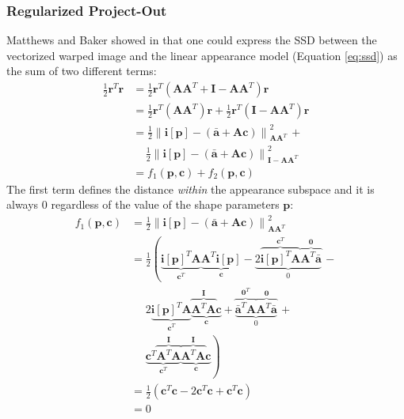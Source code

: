 \subsubsection{Regularized Project-Out}
\label{sec:rpo}

Matthews and Baker showed in \cite{Matthews2004} that one could express the SSD between the vectorized warped image and the linear appearance model (Equation \ref{eq:ssd}) as the sum of two different terms:
\begin{equation}
    \begin{aligned}
        \frac{1}{2}\mathbf{r}^T \mathbf{r} & = \frac{1}{2}\mathbf{r}^T (\mathbf{A}\mathbf{A}^T + \mathbf{I} - \mathbf{A}\mathbf{A}^T) \mathbf{r}
        \\
        & = \frac{1}{2}\mathbf{r}^T (\mathbf{A}\mathbf{A}^T) \mathbf{r} + \frac{1}{2}\mathbf{r}^T (\mathbf{I} - \mathbf{A}\mathbf{A}^T) \mathbf{r}
        \\
        & = \frac{1}{2}\left\| \mathbf{i}[\mathbf{p}] - \left( \bar{\mathbf{a}} + \mathbf{A} \mathbf{c} \right) \right\|_{\mathbf{A}\mathbf{A}^T}^2 \, + 
        \\
        & \quad \, \frac{1}{2}\left\| \mathbf{i}[\mathbf{p}] - \left( \bar{\mathbf{a}} + \mathbf{A} \mathbf{c} \right) \right\|_{\mathbf{I} - \mathbf{A}\mathbf{A}^T}^2 
        \\
        & = f_1(\mathbf{p}, \mathbf{c}) + f_2(\mathbf{p}, \mathbf{c})
    \label{eq:ssd_terms}
    \end{aligned}
\end{equation}
The first term defines the distance \emph{within} the appearance subspace and it is always $0$ regardless of the value of the shape parameters $\mathbf{p}$:
\begin{equation}
    \begin{aligned}
        f_1(\mathbf{p}, \mathbf{c}) & = \frac{1}{2}\left\| \mathbf{i}[\mathbf{p}] - \left( \bar{\mathbf{a}} + \mathbf{A} \mathbf{c} \right) \right\|_{\mathbf{A}\mathbf{A}^T}^2
        \\
        & = \frac{1}{2} \left( \underbrace{\mathbf{i}[\mathbf{p}]^T \mathbf{A}}_{\mathbf{c}^T} \underbrace{\mathbf{A}^T \mathbf{i}[\mathbf{p}]}_{\mathbf{c}} - \underbrace{2\overbrace{\mathbf{i}[\mathbf{p}]^T \mathbf{A}}^{\mathbf{c}^T} \overbrace{\mathbf{A}^T \bar{\mathbf{a}}}^{\mathbf{0}}}_{0} \, - \right.
        \\
        & \quad \,\, 2\underbrace{\mathbf{i}[\mathbf{p}]^T \mathbf{A}}_{\mathbf{c}^T} \underbrace{\overbrace{\mathbf{A}^T \mathbf{A}}^{\mathbf{I}} \mathbf{c}}_{\mathbf{c}} + \underbrace{\overbrace{\bar{\mathbf{a}}^T \mathbf{A}}^{\mathbf{0}^T} \overbrace{\mathbf{A}^T \bar{\mathbf{a}}}^{\mathbf{0}}}_{0} \, +
        \\
        & \quad \,\, \left. \underbrace{\mathbf{c}^T \overbrace{\mathbf{A}^T \mathbf{A}}^{\mathbf{I}}}_{\mathbf{c}^T} \underbrace{\overbrace{\mathbf{A}^T \mathbf{A}}^{\mathbf{I}} \mathbf{c}}_{\mathbf{c}} \right)
        \\
        & = \frac{1}{2}(\mathbf{c}^T\mathbf{c} - 2\mathbf{c}^T\mathbf{c} + \mathbf{c}^T\mathbf{c})
        \\
        & = 0
    \label{eq:ssd_term1}
    \end{aligned}
\end{equation}
